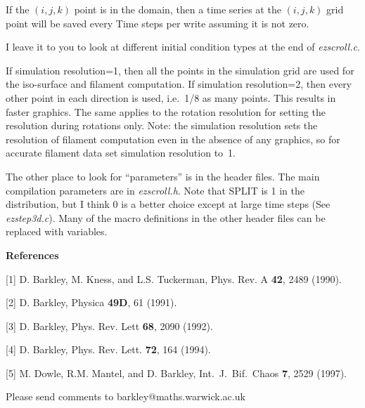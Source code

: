 If the $(i,j,k)$ point is in the domain, then a time series at the
$(i,j,k)$ grid point will be saved every {\sf Time steps per write}
assuming it is not zero.  

I leave it to you to look at different initial condition types at 
the end of {\em ezscroll.c}.

If {\sf simulation resolution}=1, then all the points in the
simulation grid are used for the iso-surface and filament computation.
If {\sf simulation resolution}=2, then every other point in each
direction is used, i.e.~1/8 as many points.  This results in faster
graphics.  The same applies to the {\sf rotation resolution} for
setting the resolution during rotations only.  Note: the {\sf
simulation resolution} sets the resolution of filament computation
even in the absence of any graphics, so for accurate filament data set
{\sf simulation resolution} to~1.

The other place to look for ``parameters'' is in the header files.
The main compilation parameters are in {\em ezscroll.h}.  Note that
{\sf SPLIT} is 1 in the distribution, but I think 0 is a better choice
except at large time steps (See {\em ezstep3d.c}).  Many of the macro
definitions in the other header files can be replaced with variables.

\bigskip

{\bf References} 

[1] D. Barkley, M. Kness, and L.S. Tuckerman, Phys. Rev. A {\bf 42}, 2489 (1990).

[2] D. Barkley, Physica {\bf 49D}, 61 (1991).

[3] D. Barkley, Phys. Rev. Lett {\bf 68}, 2090 (1992).

[4] D. Barkley, Phys. Rev. Lett. {\bf 72}, 164 (1994).

[5] M. Dowle, R.M. Mantel, and D. Barkley, 
Int.~J.~Bif.~Chaos {\bf 7}, 2529 (1997).

Please send comments to barkley@maths.warwick.ac.uk

 
